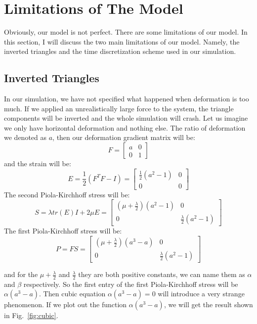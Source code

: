 \documentclass[acmtog]{acmart}
\begin{document}
\section{Limitations of The Model}
Obviously, our model is not perfect. There are some limitations of our model. In this section, I will discuss the two main limitations of our model. Namely, the inverted triangles and the time discretization scheme used in our simulation.
\subsection{Inverted Triangles}
In our simulation, we have not specified what happened when deformation is too much. If we applied an unrealistically large force to the system, the triangle components will be inverted and the whole simulation will crash. Let us imagine we only have horizontal deformation and nothing else. The ratio of deformation we denoted as $a$, then our deformation gradient matrix will be:
\begin{equation*}
F = \begin{bmatrix}
a & 0 \\
0 & 1
\end{bmatrix}
\end{equation*}
and the strain will be:
\begin{equation*}
E = \frac{1}{2} (F^T F - I) = \begin{bmatrix}
\frac{1}{2} (a^2 - 1) & 0 \\
0 & 0
\end{bmatrix}
\end{equation*}
The second Piola-Kirchhoff stress will be:
\begin{equation*}
S = \lambda tr(E) I + 2 \mu E = \begin{bmatrix}
  (\mu + \frac{\lambda}{2}) (a^2 - 1) & 0 \\
  0 & \frac{\lambda}{2} (a^2 - 1)
\end{bmatrix}
\end{equation*}
The first Piola-Kirchhoff stress will be:
\begin{equation*}
P = F S = \begin{bmatrix}
  (\mu + \frac{\lambda}{2}) (a^3 - a) & 0 \\
  0 & \frac{\lambda}{2} (a^2 - 1)
\end{bmatrix}
\end{equation*}

and for the $\mu + \frac{\lambda}{2}$ and $\frac{\lambda}{2}$ they are both positive constants, we can name them as $\alpha$ and $\beta$ respectively. So the first entry of the first Piola-Kirchhoff stress will be $\alpha (a^3 - a)$. Then cubic equation $\alpha (a^3 - a) = 0$ will introduce a very strange phenomenon. If we plot out the function $\alpha (a^3 - a)$, we will get the result shown in Fig.~\ref{fig:cubic}.
\end{document}
